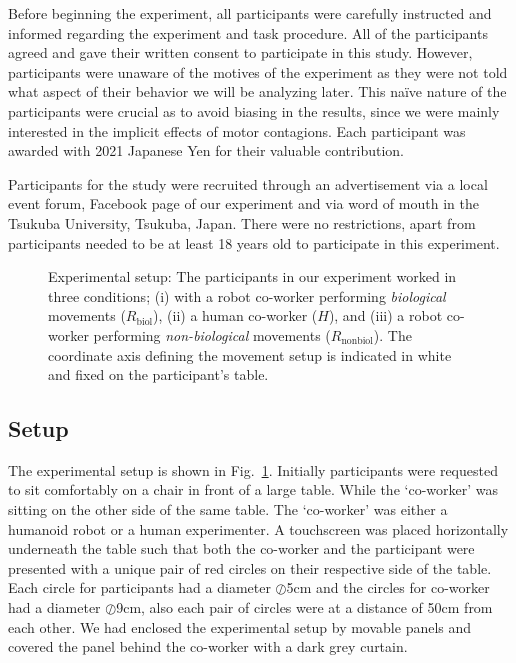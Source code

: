 Before beginning the experiment, all participants were carefully instructed and informed regarding the experiment and task procedure. All of the participants agreed and gave their written consent to participate in this study. However, participants were unaware of the motives of the experiment as they were not told what aspect of their behavior we will be analyzing later. This na\"ive nature of the participants were crucial as to avoid biasing in the results, since we were mainly interested in the implicit effects of motor contagions. Each participant was awarded with 2021 Japanese Yen for their valuable contribution.

Participants for the study were recruited through an advertisement via a local event forum, Facebook page of our experiment and via word of mouth in the Tsukuba University, Tsukuba, Japan. There were no restrictions, apart from participants needed to be at least 18 years old to participate in this experiment.


\begin{figure}[hb]
	\caption{Experimental setup: The participants in our experiment worked in three conditions; (i) with a robot co-worker performing \textit{biological} movements ($\textit{R}_{\text{biol}}$), (ii) a human co-worker ($\textit{H}$), and (iii) a robot co-worker performing \textit{non-biological} movements ($\textit{R}_{\text{nonbiol}}$). The coordinate axis defining the movement setup is indicated in white and fixed on the participant's table.}
	\label{fig:setup}
\end{figure}


\subsection{Setup}

The experimental setup is shown in Fig.~\ref{fig:setup}. Initially participants were requested to sit comfortably on a chair in front of a large table. While the `co-worker' was sitting on the other side of the same table. The `co-worker' was either a humanoid robot or a human experimenter. A touchscreen was placed horizontally underneath the table such that both the co-worker and the participant were presented with a unique pair of red circles on their respective side of the table. Each circle for participants had a diameter $\oslash$5cm and the circles for co-worker had a diameter $\oslash$9cm, also each pair of circles were at a distance of 50cm from each other. We had enclosed the experimental setup by movable panels and covered the panel behind the co-worker with a dark grey curtain. 

